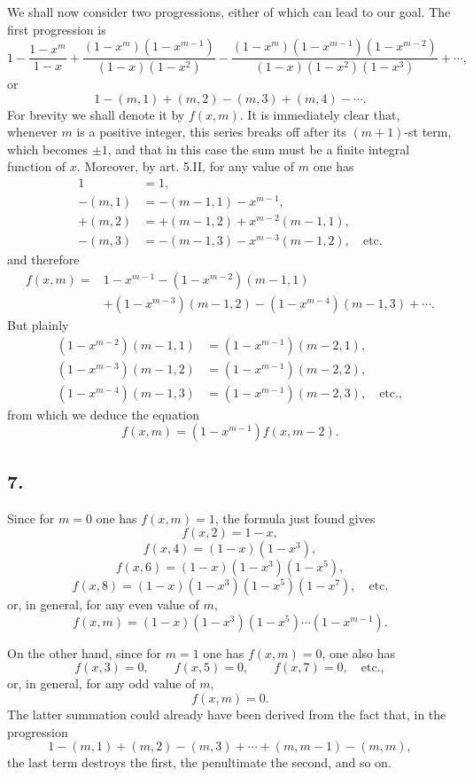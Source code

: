 \documentclass[12pt]{article}
\begin{document}
We shall now consider two progressions, either of which can lead to our goal. The first progression is
\[
1-\frac{1-x^m}{1-x}
+\frac{(1-x^m)(1-x^{m-1})}{(1-x)(1-x^2)}
-\frac{(1-x^m)(1-x^{m-1})(1-x^{m-2})}{(1-x)(1-x^2)(1-x^3)}
+\cdots,
\]
or
\[
1-(m,1)+(m,2)-(m,3)+(m,4)-\cdots.
\]
For brevity we shall denote it by $f(x,m)$. It is immediately clear that, whenever $m$ is a positive integer, this series breaks off after its $(m+1)$-st term, which becomes $\pm1$, and that in this case the sum must be a finite integral function of $x$. Moreover, by art. 5.II, for any value of $m$ one has
\[
\begin{aligned}
1&=1,\\
-(m,1)&=-(m-1,1)-x^{m-1},\\
+(m,2)&=+(m-1,2)+x^{m-2}(m-1,1),\\
-(m,3)&=-(m-1,3)-x^{m-3}(m-1,2),\quad\text{etc.}
\end{aligned}
\]
and therefore
\[
\begin{aligned}
f(x,m)=&1-x^{m-1}-(1-x^{m-2})(m-1,1)\\
&+(1-x^{m-3})(m-1,2)-(1-x^{m-4})(m-1,3)+\cdots.
\end{aligned}
\]
But plainly
\[
\begin{aligned}
(1-x^{m-2})(m-1,1)&=(1-x^{m-1})(m-2,1),\\
(1-x^{m-3})(m-1,2)&=(1-x^{m-1})(m-2,2),\\
(1-x^{m-4})(m-1,3)&=(1-x^{m-1})(m-2,3),\quad\text{etc.},
\end{aligned}
\]
from which we deduce the equation
\[
f(x,m)=(1-x^{m-1})f(x,m-2). \tag{1}
\]

\subsection*{7.}

Since for $m=0$ one has $f(x,m)=1$, the formula just found gives
\[
f(x,2)=1-x,
\]
\[
f(x,4)=(1-x)(1-x^3),
\]
\[
f(x,6)=(1-x)(1-x^3)(1-x^5),
\]
\[
f(x,8)=(1-x)(1-x^3)(1-x^5)(1-x^7),\quad\text{etc.}
\]
or, in general, for any even value of $m$,
\[
f(x,m)=(1-x)(1-x^3)(1-x^5)\cdots(1-x^{m-1}). \tag{2}
\]

On the other hand, since for $m=1$ one has $f(x,m)=0$, one also has
\[
f(x,3)=0,\qquad f(x,5)=0,\qquad f(x,7)=0,\quad\text{etc.},
\]
or, in general, for any odd value of $m$,
\[
f(x,m)=0.
\]
The latter summation could already have been derived from the fact that, in the progression
\[
1-(m,1)+(m,2)-(m,3)+\cdots+(m,m-1)-(m,m),
\]
the last term destroys the first, the penultimate the second, and so on.
\end{document}
